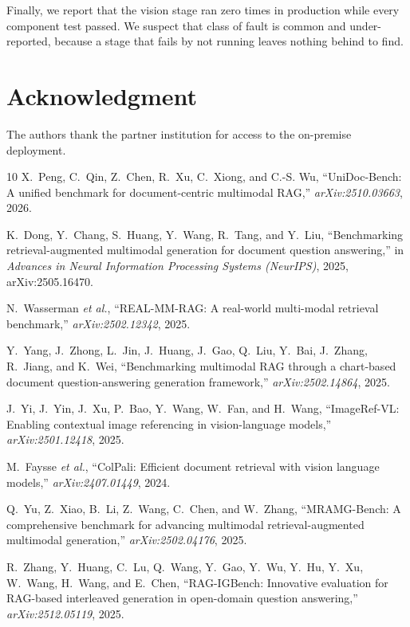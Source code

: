 \documentclass[journal]{IEEEtran}
\begin{document}
Finally, we report that the vision stage ran zero times in production while
every component test passed. We suspect that class of fault is common and
under-reported, because a stage that fails by not running leaves nothing
behind to find.

\section*{Acknowledgment}

The authors thank the partner institution for access to the on-premise
deployment.

\begin{thebibliography}{10}
\small
X.~Peng, C.~Qin, Z.~Chen, R.~Xu, C.~Xiong, and C.-S. Wu, ``UniDoc-Bench: A unified
benchmark for document-centric multimodal RAG,'' \emph{arXiv:2510.03663}, 2026.

K.~Dong, Y.~Chang, S.~Huang, Y.~Wang, R.~Tang, and Y.~Liu, ``Benchmarking
retrieval-augmented multimodal generation for document question answering,'' in
\emph{Advances in Neural Information Processing Systems (NeurIPS)}, 2025,
arXiv:2505.16470.

N.~Wasserman \emph{et al.}, ``REAL-MM-RAG: A real-world multi-modal retrieval
benchmark,'' \emph{arXiv:2502.12342}, 2025.

Y.~Yang, J.~Zhong, L.~Jin, J.~Huang, J.~Gao, Q.~Liu, Y.~Bai, J.~Zhang, R.~Jiang,
and K.~Wei, ``Benchmarking multimodal RAG through a chart-based document
question-answering generation framework,'' \emph{arXiv:2502.14864}, 2025.

J.~Yi, J.~Yin, J.~Xu, P.~Bao, Y.~Wang, W.~Fan, and H.~Wang, ``ImageRef-VL:
Enabling contextual image referencing in vision-language models,''
\emph{arXiv:2501.12418}, 2025.

M.~Faysse \emph{et al.}, ``ColPali: Efficient document retrieval with vision
language models,'' \emph{arXiv:2407.01449}, 2024.

Q.~Yu, Z.~Xiao, B.~Li, Z.~Wang, C.~Chen, and W.~Zhang, ``MRAMG-Bench: A
comprehensive benchmark for advancing multimodal retrieval-augmented multimodal
generation,'' \emph{arXiv:2502.04176}, 2025.

R.~Zhang, Y.~Huang, C.~Lu, Q.~Wang, Y.~Gao, Y.~Wu, Y.~Hu, Y.~Xu, W.~Wang,
H.~Wang, and E.~Chen, ``RAG-IGBench: Innovative evaluation for RAG-based
interleaved generation in open-domain question answering,''
\emph{arXiv:2512.05119}, 2025.


\end{thebibliography}
\end{document}
